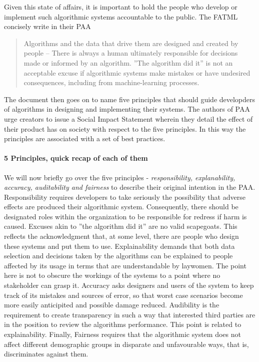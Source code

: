 \documentclass{article}
\begin{document}
Given this state of affairs, it is important to hold the people who develop or implement such algorithmic systems accountable to the public. The FATML concisely write in their PAA \cite{principles}
\begin{quote}
Algorithms and the data that drive them are designed and created by people -- There is always a human ultimately responsible for decisions made or informed by an algorithm. ''The algorithm did it'' is not an acceptable excuse if algorithmic systems make mistakes or have undesired consequences, including from machine-learning processes.
\end{quote}

The document then goes on to name five principles that should guide developders of algorithms in designing and implementing their systems. The authors of PAA urge creators to issue a Social Impact Statement wherein they detail the effect of their product has on society with respect to the five principles. In this way the principles are associated with a set of best practices.
\paragraph{5 Principles, quick recap of each of them}
We will now briefly go over the five principles - \emph{responsibility, explanability, accuracy, auditability and fairness} to describe their original intention in the PAA.
Responsibility requires developers to take seriously the possibility that adverse effects are produced their algorithmic system. Consequently, there should be designated roles within the organization to be responsible for redress if harm is caused. Excuses akin to ''the algorithm did it'' are no valid scapegoats. This reflects the acknowledgment that, at some level, there are people who design these systems and put them to use.
Explainability demands that both data selection and decisions taken by the algorithms can be explained to people affected by its usage in terms that are understandable by laywomen. The point here is not to obscure the workings of the systems to a point where no stakeholder can grasp it.
Accuracy asks designers and users of the system to keep track of its mistakes and sources of error, so that worst case scenarios become more easily anticipited and possible damage reduced.
Audibility is the requirement to create transparency in such a way that interested third parties are in the position to review the algorithms performance. This point is related to explainability.
Finally, Fairness requires that the algorithmic system does not affect different demographic groups in disparate and unfavourable ways, that is, discriminates against them.
\end{document}
